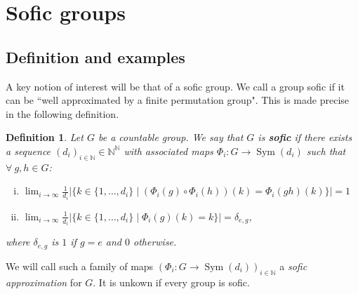 \documentclass[titlepage, a4paper]{article}
\newcommand{\N}{\mathbb{N}}
\newcommand{\card}[1]{\left| #1 \right|}
\DeclareMathOperator{\sym}{Sym}
\newtheorem{definition}{Definition}
\theoremstyle{remark}
\begin{document}
\section{Sofic groups}\label{sec:sofic_group}

\subsection{Definition and examples}

    A key notion of interest will be that of a sofic group. We call a group sofic if it can be ``well approximated by a finite permutation group". This is made precise in the following definition.

    \begin{definition}\label{def:Sofic}
	    Let $G$ be a countable group. We say that $G$ is \textbf{sofic} if there exists a sequence $(d_i)_{i \in \N} \in \N ^{\N}$ with associated maps $\Phi_i : G \to \sym(d_i)$ such that $\forall\ g, h \in G$:
        \begin{enumerate}[(i)]
            \item $\displaystyle \lim_{i\to \infty} \frac{1}{d_i} \card{\big\{k \in \{1, \dots, d_i\} \mid (\Phi_i(g) \circ \Phi_i(h))(k) = \Phi_i(gh) (k) \big\}} = 1$
            \item $\displaystyle \lim_{i\to \infty} \frac{1}{d_i}  \card{\big\{k \in \{1, \dots, d_i\} \mid \Phi_i(g)(k) = k \big\}} = \delta_{e,g}$,
        \end{enumerate}
        where $\delta_{e,g}$ is $1$ if $g = e$ and $0$ otherwise.
    \end{definition}

    We will call such a family of maps $\left(\Phi_i : G \to \sym(d_i) \right)_{i \in \N}$ a \emph{sofic approximation} for $G$. It is unkown if every group is sofic.


\end{document}
